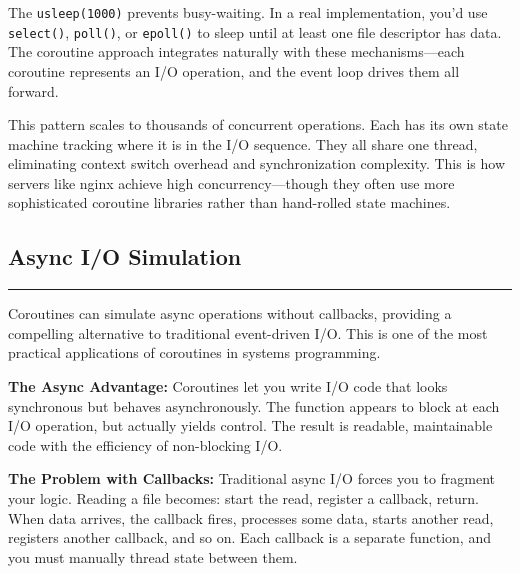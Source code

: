 The \texttt{usleep(1000)} prevents busy-waiting. In a real implementation, you'd use \texttt{select()}, \texttt{poll()}, or \texttt{epoll()} to sleep until at least one file descriptor has data. The coroutine approach integrates naturally with these mechanisms---each coroutine represents an I/O operation, and the event loop drives them all forward.

This pattern scales to thousands of concurrent operations. Each has its own state machine tracking where it is in the I/O sequence. They all share one thread, eliminating context switch overhead and synchronization complexity. This is how servers like nginx achieve high concurrency---though they often use more sophisticated coroutine libraries rather than hand-rolled state machines.

\vspace{0.5cm}
\subsection{Async I/O Simulation}

\noindent\rule{\textwidth}{0.4pt}
\vspace{0.2cm}

Coroutines can simulate async operations without callbacks, providing a compelling alternative to traditional event-driven I/O. This is one of the most practical applications of coroutines in systems programming.

\begin{tipbox}
\textbf{The Async Advantage:} Coroutines let you write I/O code that looks synchronous but behaves asynchronously. The function appears to block at each I/O operation, but actually yields control. The result is readable, maintainable code with the efficiency of non-blocking I/O.
\end{tipbox}

\vspace{0.2cm}
\noindent\textbf{The Problem with Callbacks:} Traditional async I/O forces you to fragment your logic. Reading a file becomes: start the read, register a callback, return. When data arrives, the callback fires, processes some data, starts another read, registers another callback, and so on. Each callback is a separate function, and you must manually thread state between them.

